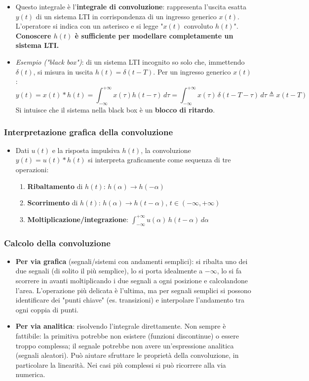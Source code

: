 \documentclass[12pt, a4paper]{article}
\begin{document}
\begin{itemize}
    \item Questo integrale è l'\textbf{integrale di convoluzione}: rappresenta l'uscita esatta $y(t)$ di un sistema LTI in corrispondenza di un ingresso generico $x(t)$. L'operatore si indica con un asterisco e si legge "$x(t)$ convoluto $h(t)$". \textbf{Conoscere $h(t)$ è sufficiente per modellare completamente un sistema LTI.}
    \item \textit{Esempio ("black box")}: di un sistema LTI incognito so solo che, immettendo $\delta(t)$, si misura in uscita $h(t)=\delta(t-T)$. Per un ingresso generico $x(t)$:
    $$y(t) = x(t)*h(t) = \int_{-\infty}^{+\infty} x(\tau)h(t-\tau)\,d\tau = \int_{-\infty}^{+\infty} x(\tau)\,\delta(t-T-\tau)\,d\tau \triangleq x(t-T)$$
    Si intuisce che il sistema nella black box è un \textbf{blocco di ritardo}.
\end{itemize}

\subsubsection{Interpretazione grafica della convoluzione}
\begin{itemize}
    \item Dati $u(t)$ e la risposta impulsiva $h(t)$, la convoluzione $y(t)=u(t)*h(t)$ si interpreta graficamente come sequenza di tre operazioni:
    \begin{enumerate}
        \item \textbf{Ribaltamento} di $h(t)$: $h(\alpha) \to h(-\alpha)$
        \item \textbf{Scorrimento} di $h(t)$: $h(\alpha) \to h(t-\alpha)$, $t\in(-\infty,+\infty)$
        \item \textbf{Moltiplicazione/integrazione}: $\displaystyle\int_{-\infty}^{+\infty} u(\alpha)\,h(t-\alpha)\,d\alpha$
    \end{enumerate}
\end{itemize}

\subsubsection{Calcolo della convoluzione}
\begin{itemize}
    \item \textbf{Per via grafica} (segnali/sistemi con andamenti semplici): si ribalta uno dei due segnali (di solito il più semplice), lo si porta idealmente a $-\infty$, lo si fa scorrere in avanti moltiplicando i due segnali a ogni posizione e calcolandone l'area. L'operazione più delicata è l'ultima, ma per segnali semplici si possono identificare dei "punti chiave" (es. transizioni) e interpolare l'andamento tra ogni coppia di punti.
    \item \textbf{Per via analitica}: risolvendo l'integrale direttamente. Non sempre è fattibile: la primitiva potrebbe non esistere (funzioni discontinue) o essere troppo complessa; il segnale potrebbe non avere un'espressione analitica (segnali aleatori). Può aiutare sfruttare le proprietà della convoluzione, in particolare la linearità. Nei casi più complessi si può ricorrere alla via numerica.
\end{itemize}
\end{document}
